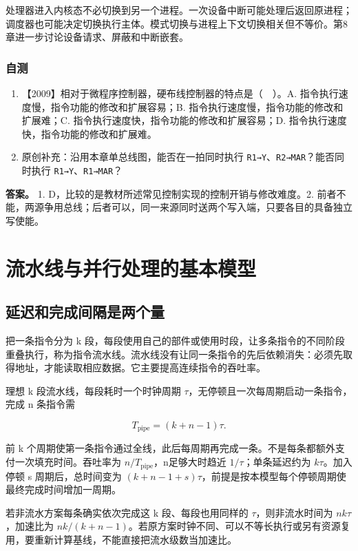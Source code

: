 处理器进入内核态不必切换到另一个进程。一次设备中断可能处理后返回原进程；调度器也可能决定切换执行主体。模式切换与进程上下文切换相关但不等价。第8章进一步讨论设备请求、屏蔽和中断嵌套。

\subsection{自测}\label{co-self5}

\begin{enumerate}
\def\labelenumi{\arabic{enumi}.}
\tightlist
\item
  【2009】相对于微程序控制器，硬布线控制器的特点是（　）。A. 指令执行速度慢，指令功能的修改和扩展容易；B. 指令执行速度慢，指令功能的修改和扩展难；C. 指令执行速度快，指令功能的修改和扩展容易；D. 指令执行速度快，指令功能的修改和扩展难。
\item
  原创补充：沿用本章单总线图，能否在一拍同时执行 \texttt{R1→Y}、\texttt{R2→MAR}？能否同时执行 \texttt{R1→Y}、\texttt{R1→MAR}？
\end{enumerate}

\textbf{答案。} 1. D，比较的是教材所述常见控制实现的控制开销与修改难度。2. 前者不能，两源争用总线；后者可以，同一来源同时送两个写入端，只要各目的具备独立写使能。

\chapter{流水线与并行处理的基本模型}\label{co-ch6}

\section{延迟和完成间隔是两个量}\label{co-06-01}

把一条指令分为 k 段，每段使用自己的部件或使用时段，让多条指令的不同阶段重叠执行，称为指令流水线。流水线没有让同一条指令的先后依赖消失：必须先取得地址，才能读取相应数据。它主要提高连续指令的吞吐率。

理想 k 段流水线，每段耗时一个时钟周期 \(\tau\)，无停顿且一次每周期启动一条指令，完成 n 条指令需

\[
T_{\mathrm{pipe}}=(k+n-1)\tau.
\]

前 k 个周期使第一条指令通过全线，此后每周期再完成一条。不是每条都额外支付一次填充时间。吞吐率为 \(n/T_{\mathrm{pipe}}\)，n足够大时趋近 \(1/\tau\)；单条延迟约为 \(k\tau\)。加入停顿 s 周期后，总时间变为 \((k+n-1+s)\tau\)，前提是按本模型每个停顿周期使最终完成时间增加一周期。

若非流水方案每条确实依次完成这 k 段、每段也用同样的 \(\tau\)，则非流水时间为 \(nk\tau\)，加速比为 \(nk/(k+n-1)\)。若原方案时钟不同、可以不等长执行或另有资源复用，要重新计算基线，不能直接把流水级数当加速比。


